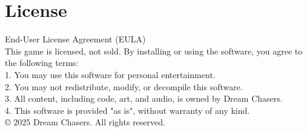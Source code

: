 \documentclass{article}
\begin{document}
\newpage
\section{License}
End-User License Agreement (EULA)\\
\newline
\noindent This game is licensed, not sold. By installing or using the software, you agree to the following terms:\\
1. You may use this software for personal entertainment.\\
2. You may not redistribute, modify, or decompile this software.\\
3. All content, including code, art, and audio, is owned by Dream Chasers.\\
4. This software is provided "as is", without warranty of any kind.\\
\newline
\noindent © 2025 Dream Chasers. All rights reserved.
\end{document}
